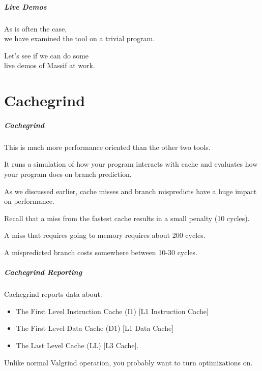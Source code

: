 \begin{frame}
\frametitle{Live Demos}

\large
\begin{changemargin}{2cm}
As is often the case, \\ we have examined the tool on a trivial program. 

Let's see if we can do some\\
 live demos of Massif at work.
\end{changemargin}
\end{frame}

\part{Cachegrind}
\begin{frame}
\partpage
\end{frame}

\begin{frame}
\frametitle{Cachegrind}

This is much more performance oriented than the other two tools. 

 It runs a simulation of how your program interacts with cache and evaluates how your program does on branch prediction.
 
 As we discussed earlier, cache misses and branch mispredicts have a huge impact on performance.
 
 Recall that a miss from the fastest cache results in a small penalty (10 cycles).
 
 A miss that requires going to memory requires about 200 cycles. 
 
 A mispredicted branch costs somewhere between 10-30 cycles.


\end{frame}

\begin{frame}
\frametitle{Cachegrind Reporting}

Cachegrind reports data about:
\begin{itemize}
	\item The First Level Instruction Cache (I1) [L1 Instruction Cache]
	\item The First Level Data Cache (D1) [L1 Data Cache]
	\item The Last Level Cache (LL) [L3 Cache].
\end{itemize}

Unlike normal Valgrind operation, you probably want to turn optimizations on.

\end{frame}

